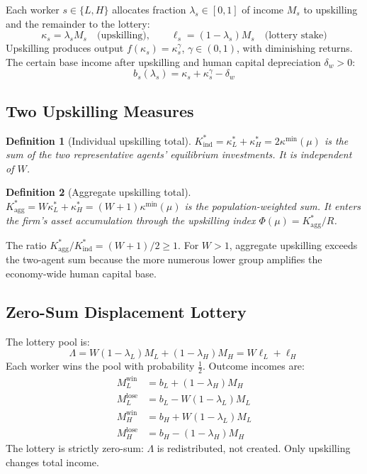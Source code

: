 \documentclass[12pt,a4paper]{article}
\newtheorem{definition}{Definition}
\begin{document}
Each worker $s \in \{L, H\}$ allocates fraction $\lambda_s \in [0,1]$
of income $M_s$ to upskilling and the remainder to the lottery:
\begin{equation}
  \kappa_s = \lambda_s M_s \quad \text{(upskilling)},
  \qquad
  \ell_s = (1-\lambda_s)M_s \quad \text{(lottery stake)}
  \label{eq:budget}
\end{equation}
Upskilling produces output $f(\kappa_s) = \kappa_s^\gamma$,
$\gamma \in (0,1)$, with diminishing returns. The certain base income
after upskilling and human capital depreciation $\delta_w > 0$:
\begin{equation}
  b_s(\lambda_s) = \kappa_s + \kappa_s^\gamma - \delta_w
  \label{eq:base_income}
\end{equation}

\subsection{Two Upskilling Measures}

\begin{definition}[Individual upskilling total]
$K^*_{\mathrm{ind}} = \kappa_L^* + \kappa_H^* = 2\kappa^{\min}(\mu)$
is the sum of the two representative agents' equilibrium investments.
It is independent of $W$.
\end{definition}

\begin{definition}[Aggregate upskilling total]
$K^*_{\mathrm{agg}} = W\kappa_L^* + \kappa_H^* = (W+1)\kappa^{\min}(\mu)$
is the population-weighted sum. It enters the firm's asset accumulation
through the upskilling index $\Phi(\mu) = K^*_{\mathrm{agg}}/R$.
\end{definition}

The ratio $K^*_{\mathrm{agg}}/K^*_{\mathrm{ind}} = (W+1)/2 \geq 1$.
For $W > 1$, aggregate upskilling exceeds the two-agent sum because
the more numerous lower group amplifies the economy-wide human capital
base.

\subsection{Zero-Sum Displacement Lottery}

The lottery pool is:
\begin{equation}
  \Lambda = W(1-\lambda_L)M_L + (1-\lambda_H)M_H = W\ell_L + \ell_H
  \label{eq:pool}
\end{equation}
Each worker wins the pool with probability $\tfrac{1}{2}$. Outcome
incomes are:
\begin{align}
  M_L^{\mathrm{win}}  &= b_L + (1-\lambda_H)M_H \label{eq:MLwin} \\
  M_L^{\mathrm{lose}} &= b_L - W(1-\lambda_L)M_L \label{eq:MLlose} \\
  M_H^{\mathrm{win}}  &= b_H + W(1-\lambda_L)M_L \label{eq:MHwin} \\
  M_H^{\mathrm{lose}} &= b_H - (1-\lambda_H)M_H \label{eq:MHlose}
\end{align}
The lottery is strictly zero-sum: $\Lambda$ is redistributed, not
created. Only upskilling changes total income.
\end{document}
